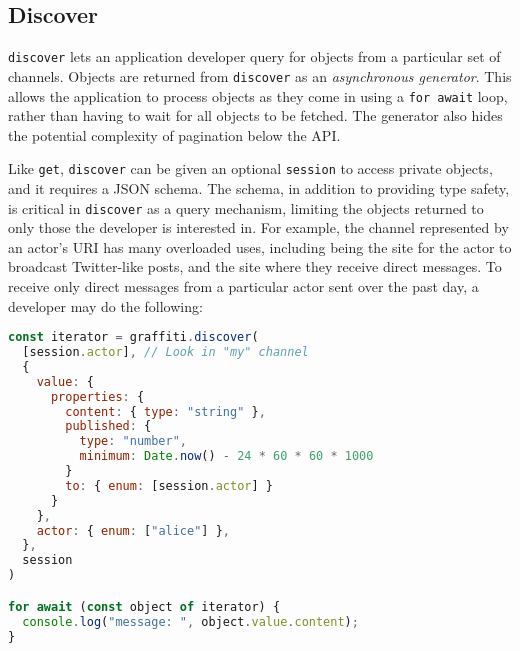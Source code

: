 

\subsection{Discover}

\texttt{discover} lets an application developer query for objects
from a particular set of channels.
Objects are returned from \texttt{discover} as an \emph{asynchronous generator}.
This allows the application to process objects as they come in
using a \texttt{for await} loop, rather than having to wait for all objects
to be fetched. The generator also hides the potential complexity of
pagination below the API.

Like \texttt{get}, \texttt{discover} can be given an optional \texttt{session}
to access private objects, and it requires a JSON schema.
The schema,
in addition to providing type safety, is critical in \texttt{discover}
as a query mechanism, limiting the objects returned to only those the developer is interested in.
For example, the channel represented by an actor's URI has many overloaded uses,
including being the site for the actor to broadcast Twitter-like posts,
and the site where they receive direct messages.
To receive only direct messages from a particular actor
sent over the past day, a developer may do the following:

\begin{lstlisting}[language=javascript]
const iterator = graffiti.discover(
  [session.actor], // Look in "my" channel
  {
    value: {
      properties: {
        content: { type: "string" },
        published: {
          type: "number",
          minimum: Date.now() - 24 * 60 * 60 * 1000
        }
        to: { enum: [session.actor] }
      }
    },
    actor: { enum: ["alice"] },
  },
  session
)

for await (const object of iterator) {
  console.log("message: ", object.value.content);
}
\end{lstlisting}

